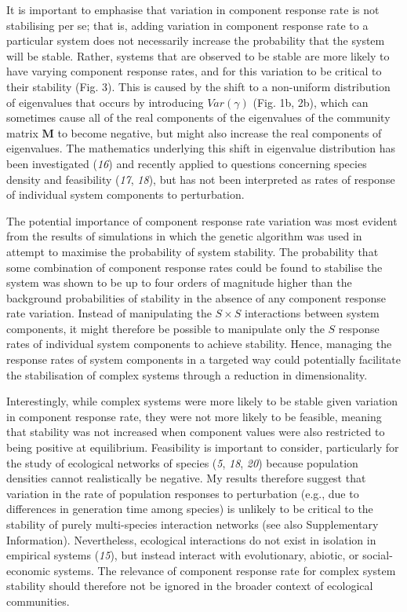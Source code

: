 \documentclass[]{article}
\begin{document}
It is important to emphasise that variation in component response rate
is not stabilising per se; that is, adding variation in component
response rate to a particular system does not necessarily increase the
probability that the system will be stable. Rather, systems that are
observed to be stable are more likely to have varying component response
rates, and for this variation to be critical to their stability (Fig.
3). This is caused by the shift to a non-uniform distribution of
eigenvalues that occurs by introducing \(Var(\gamma)\) (Fig. 1b, 2b),
which can sometimes cause all of the real components of the eigenvalues
of the community matrix \(\mathbf{M}\) to become negative, but might
also increase the real components of eigenvalues. The mathematics
underlying this shift in eigenvalue distribution has been investigated
(\emph{16}) and recently applied to questions concerning species density
and feasibility (\emph{17}, \emph{18}), but has not been interpreted as
rates of response of individual system components to perturbation.

The potential importance of component response rate variation was most
evident from the results of simulations in which the genetic algorithm
was used in attempt to maximise the probability of system stability. The
probability that some combination of component response rates could be
found to stabilise the system was shown to be up to four orders of
magnitude higher than the background probabilities of stability in the
absence of any component response rate variation. Instead of
manipulating the \(S \times S\) interactions between system components,
it might therefore be possible to manipulate only the \(S\) response
rates of individual system components to achieve stability. Hence,
managing the response rates of system components in a targeted way could
potentially facilitate the stabilisation of complex systems through a
reduction in dimensionality.

Interestingly, while complex systems were more likely to be stable given
variation in component response rate, they were not more likely to be
feasible, meaning that stability was not increased when component values
were also restricted to being positive at equilibrium. Feasibility is
important to consider, particularly for the study of ecological networks
of species (\emph{5}, \emph{18}, \emph{20}) because population densities
cannot realistically be negative. My results therefore suggest that
variation in the rate of population responses to perturbation (e.g., due
to differences in generation time among species) is unlikely to be
critical to the stability of purely multi-species interaction networks
(see also Supplementary Information). Nevertheless, ecological
interactions do not exist in isolation in empirical systems (\emph{15}),
but instead interact with evolutionary, abiotic, or social-economic
systems. The relevance of component response rate for complex system
stability should therefore not be ignored in the broader context of
ecological communities.
\end{document}
